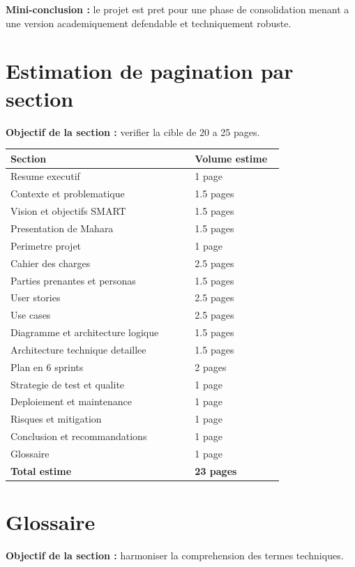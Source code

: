\documentclass[12pt,a4paper]{article}
\begin{document}
\textbf{Mini-conclusion :} le projet est pret pour une phase de consolidation menant a une version academiquement defendable et techniquement robuste.

\section{Estimation de pagination par section}
\textbf{Objectif de la section :} verifier la cible de 20 a 25 pages.

\begin{longtable}{p{0.62\linewidth}p{0.3\linewidth}}
\toprule
\textbf{Section} & \textbf{Volume estime} \\
\midrule
Resume executif & 1 page \\
Contexte et problematique & 1.5 pages \\
Vision et objectifs SMART & 1.5 pages \\
Presentation de Mahara & 1.5 pages \\
Perimetre projet & 1 page \\
Cahier des charges & 2.5 pages \\
Parties prenantes et personas & 1.5 pages \\
User stories & 2.5 pages \\
Use cases & 2.5 pages \\
Diagramme et architecture logique & 1.5 pages \\
Architecture technique detaillee & 1.5 pages \\
Plan en 6 sprints & 2 pages \\
Strategie de test et qualite & 1 page \\
Deploiement et maintenance & 1 page \\
Risques et mitigation & 1 page \\
Conclusion et recommandations & 1 page \\
Glossaire & 1 page \\
\midrule
\textbf{Total estime} & \textbf{23 pages} \\
\bottomrule
\end{longtable}

\section{Glossaire}
\textbf{Objectif de la section :} harmoniser la comprehension des termes techniques.
\end{document}
